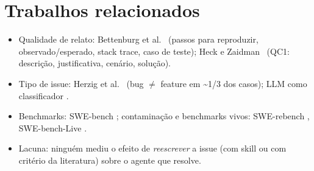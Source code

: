\documentclass[sigconf]{acmart}
\newcommand{\topicos}[1]{{\color{gray}\begin{itemize}\setlength\itemsep{0pt}#1\end{itemize}}}
\begin{document}
\section{Trabalhos relacionados}
\topicos{
\item Qualidade de relato: Bettenburg et al.~\cite{bettenburg2008} (passos para reproduzir, observado/esperado, stack trace, caso de teste); Heck e Zaidman~\cite{heck2017} (QC1: descrição, justificativa, cenário, solução).
\item Tipo de issue: Herzig et al.~\cite{herzig2013} (bug $\neq$ feature em \textasciitilde1/3 dos casos); LLM como classificador \cite{colavito2024}.
\item Benchmarks: SWE-bench \cite{jimenez2024swebench}; contaminação e benchmarks vivos: SWE-rebench \cite{badertdinov2025swerebench}, SWE-bench-Live \cite{zhang2025swebenchlive}.
\item Lacuna: ninguém mediu o efeito de \emph{reescrever} a issue (com skill ou com critério da literatura) sobre o agente que resolve.
}
\end{document}
